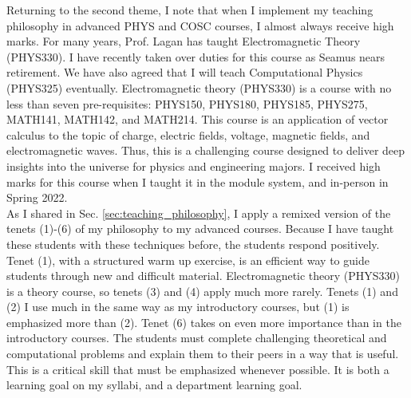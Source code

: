 \documentclass[../../../main.tex]{subfiles}
\begin{document}
Returning to the second theme, I note that when I implement my teaching philosophy in advanced PHYS and COSC courses, I almost always receive high marks.  For many years, Prof. Lagan has taught Electromagnetic Theory (PHYS330).  I have recently taken over duties for this course as Seamus nears retirement.  We have also agreed that I will teach Computational Physics (PHYS325) eventually.  Electromagnetic theory (PHYS330) is a course with no less than seven pre-requisites: PHYS150, PHYS180, PHYS185, PHYS275, MATH141, MATH142, and MATH214.  This course is an application of vector calculus to the topic of charge, electric fields, voltage, magnetic fields, and electromagnetic waves.  Thus, this is a challenging course designed to deliver deep insights into the universe for physics and engineering majors.  I received high marks for this course when I taught it in the module system, and in-person in Spring 2022.
\\
\vspace{0.15cm}
As I shared in Sec. \ref{sec:teaching_philosophy}, I apply a remixed version of the tenets (1)-(6) of my philosophy to my advanced courses.  Because I have taught these students with these techniques before, the students respond positively. Tenet (1), with a structured warm up exercise, is an efficient way to guide students through new and difficult material. Electromagnetic theory (PHYS330) is a theory course, so tenets (3) and (4) apply much more rarely.  Tenets (1) and (2) I use much in the same way as my introductory courses, but (1) is emphasized more than (2).  Tenet (6) takes on even more importance than in the introductory courses.  The students must complete challenging theoretical and computational problems and explain them to their peers in a way that is useful.  This is a critical skill that must be emphasized whenever possible.  It is both a learning goal on my syllabi, and a department learning goal.
\\
\vspace{0.15cm}
\end{document}
